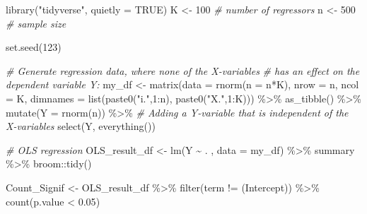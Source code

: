 \documentclass[
]{book}
\newenvironment{Shaded}{\begin{snugshade}}{\end{snugshade}}
\newcommand{\AttributeTok}[1]{\textcolor[rgb]{0.77,0.63,0.00}{#1}}
\newcommand{\CommentTok}[1]{\textcolor[rgb]{0.56,0.35,0.01}{\textit{#1}}}
\newcommand{\ConstantTok}[1]{\textcolor[rgb]{0.00,0.00,0.00}{#1}}
\newcommand{\DecValTok}[1]{\textcolor[rgb]{0.00,0.00,0.81}{#1}}
\newcommand{\FloatTok}[1]{\textcolor[rgb]{0.00,0.00,0.81}{#1}}
\newcommand{\FunctionTok}[1]{\textcolor[rgb]{0.00,0.00,0.00}{#1}}
\newcommand{\NormalTok}[1]{#1}
\newcommand{\OtherTok}[1]{\textcolor[rgb]{0.56,0.35,0.01}{#1}}
\newcommand{\SpecialCharTok}[1]{\textcolor[rgb]{0.00,0.00,0.00}{#1}}
\newcommand{\StringTok}[1]{\textcolor[rgb]{0.31,0.60,0.02}{#1}}
\begin{document}
\begin{Shaded}
\begin{Highlighting}[]
\FunctionTok{library}\NormalTok{(}\StringTok{"tidyverse"}\NormalTok{, }\AttributeTok{quietly =} \ConstantTok{TRUE}\NormalTok{)}
\NormalTok{K }\OtherTok{\textless{}{-}} \DecValTok{100} \CommentTok{\# number of regressors}
\NormalTok{n }\OtherTok{\textless{}{-}} \DecValTok{500} \CommentTok{\# sample size}

\FunctionTok{set.seed}\NormalTok{(}\DecValTok{123}\NormalTok{)}

\CommentTok{\# Generate regression data, where none of the X{-}variables }
\CommentTok{\# has an effect on the dependent variable Y:}
\NormalTok{my\_df }\OtherTok{\textless{}{-}} \FunctionTok{matrix}\NormalTok{(}\AttributeTok{data =} \FunctionTok{rnorm}\NormalTok{(}\AttributeTok{n =}\NormalTok{ n}\SpecialCharTok{*}\NormalTok{K), }
                \AttributeTok{nrow =}\NormalTok{ n, }\AttributeTok{ncol =}\NormalTok{ K, }
                \AttributeTok{dimnames =} \FunctionTok{list}\NormalTok{(}\FunctionTok{paste0}\NormalTok{(}\StringTok{"i."}\NormalTok{,}\DecValTok{1}\SpecialCharTok{:}\NormalTok{n), }
                                \FunctionTok{paste0}\NormalTok{(}\StringTok{"X."}\NormalTok{,}\DecValTok{1}\SpecialCharTok{:}\NormalTok{K))) }\SpecialCharTok{\%\textgreater{}\%} 
  \FunctionTok{as\_tibble}\NormalTok{() }\SpecialCharTok{\%\textgreater{}\%} 
  \FunctionTok{mutate}\NormalTok{(}\AttributeTok{Y =} \FunctionTok{rnorm}\NormalTok{(n)) }\SpecialCharTok{\%\textgreater{}\%} \CommentTok{\# Adding a Y{-}variable that is independent of the X{-}variables}
  \FunctionTok{select}\NormalTok{(Y, }\FunctionTok{everything}\NormalTok{())  }

\CommentTok{\# OLS regression}
\NormalTok{OLS\_result\_df }\OtherTok{\textless{}{-}} \FunctionTok{lm}\NormalTok{(Y }\SpecialCharTok{\textasciitilde{}}\NormalTok{ . , }\AttributeTok{data =}\NormalTok{ my\_df) }\SpecialCharTok{\%\textgreater{}\%} 
\NormalTok{  summary }\SpecialCharTok{\%\textgreater{}\%} 
\NormalTok{  broom}\SpecialCharTok{::}\FunctionTok{tidy}\NormalTok{()}


\NormalTok{Count\_Signif }\OtherTok{\textless{}{-}}\NormalTok{ OLS\_result\_df }\SpecialCharTok{\%\textgreater{}\%} 
  \FunctionTok{filter}\NormalTok{(term }\SpecialCharTok{!=} \StringTok{\textquotesingle{}(Intercept)\textquotesingle{}}\NormalTok{) }\SpecialCharTok{\%\textgreater{}\%} 
  \FunctionTok{count}\NormalTok{(p.value }\SpecialCharTok{\textless{}} \FloatTok{0.05}\NormalTok{)}
\end{Highlighting}
\end{Shaded}
\end{document}
